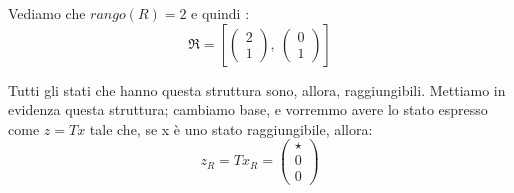 \documentclass{article}
\begin{document}
Vediamo che $rango(R) = 2$ e quindi : \[ \mathfrak{R} = \left[ \left(\begin{matrix}2\\1\end{matrix}\right), \  \left(\begin{matrix}0\\1\end{matrix}\right)\right] \]

Tutti gli stati che hanno questa struttura sono, allora, raggiungibili. Mettiamo in evidenza questa struttura;
cambiamo base, e vorremmo avere lo stato espresso come $z = Tx$ tale che, se x è uno stato raggiungibile, allora: \[ z_R = T x_R = \begin{pmatrix} \star  \\ 0 \\0\end{pmatrix}\]
\end{document}
